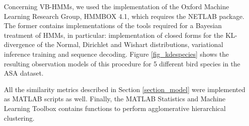 \documentclass[pdftex,11pt,a4paper]{article}
\theoremstyle{definition}
\theoremstyle{remark}
\newcommand*{\V}[1]{\mathbf{#1}}%
\begin{document}
\par Concerning VB-HMMs, we used the implementation of the Oxford Machine Learning Research Group, HMMBOX 4.1, which requires the NETLAB package. The former contains implementations of the tools required for a Bayesian treatment of HMMs, in particular: implementation of closed forms for the KL-divergence of the Normal, Dirichlet and Wishart distributions, variational inference training and sequence decoding. Figure \ref{fig_kdespecies} shows the resulting observation models of this procedure for 5 different bird species in the ASA dataset. %
\par All the similarity metrics described in Section \ref{section_model} were implemented as MATLAB scripts as well. Finally, the MATLAB Statistics and Machine Learning Toolbox contains functions to perform agglomerative hierarchical clustering.
\end{document}
